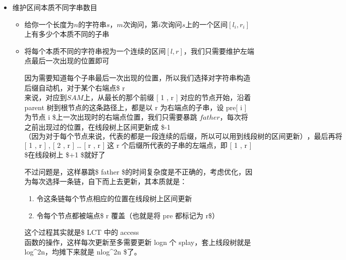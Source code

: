 \documentclass[]{article}
\providecommand{\tightlist}{%
  \setlength{\itemsep}{0pt}\setlength{\parskip}{0pt}}
\begin{document}
\begin{itemize}
\item
  维护区间本质不同字串数目

  \begin{itemize}
  \item
    给你一个长度为\(n\)的字符串\(s\)，\(m\)次询问，第\(i\)次询问\(s\)上的一个区间\([l_i,r_i]\)上有多少个本质不同的子串
  \item
    将每个本质不同的字符串视为一个连续的区间\([l,r]\)，我们只需要维护左端点最后一次出现的位置即可

    因为需要知道每个子串最后一次出现的位置，所以我们选择对字符串构造后缀自动机，对于某个右端点\$
    r \(来说，对应到 SAM 上，从最长的那个前缀\) {[} 1 , r {]}
    \(对应的节点开始，沿着\) parent \(树到根节点的这条路径上，都是以\) r
    \(为右端点的子串，设\) pre{[} i {]} \(为节点\) i
    \$上一次出现时的右端点位置，我们只需要暴跳
    \(father\)，每次将之前出现过的位置，在线段树上区间更新成 \$-1
    \(（因为对于每个节点来说，代表的都是一段连续的后缀，所以可以用到线段树的区间更新），最后再将\)
    {[} 1 , r {]} , {[} 2 , r {]} \ldots{} {[} r , r {]} \(这\) r
    \(个后缀所代表的子串的左端点，即\) {[} 1 , r {]} \$在线段树上 \$+1
    \$就好了

    不过问题是，这样暴跳\$ father
    \$的时间复杂度是不正确的，考虑优化，因为每次选择一条链，自下而上去更新，其本质就是：

    \begin{enumerate}
    \def\labelenumi{\arabic{enumi}.}
    \tightlist
    \item
      令这条链每个节点相应的位置在线段树上区间更新
    \item
      令每个节点都被端点\$ r \(覆盖（也就是将\) pre \(都标记为\) r\$）
    \end{enumerate}

    这个过程其实就是\$ LCT \(中的\) access
    \(函数的操作，这样每次更新至多需要更新\) logn \(个\)
    splay\(，套上线段树就是\) log\^{}2n\(，均摊下来就是\) nlog\^{}2n
    \$了。
  \end{itemize}
\end{itemize}
\end{document}
